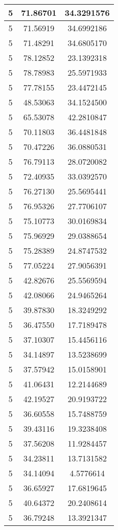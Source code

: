 \documentclass[
]{book}
\begin{document}
\begin{tabular}{c|c|c}
\hline
5 & 71.86701 & 34.3291576\\
\hline
5 & 71.56919 & 34.6992186\\
\hline
5 & 71.48291 & 34.6805170\\
\hline
5 & 78.12852 & 23.1392318\\
\hline
5 & 78.78983 & 25.5971933\\
\hline
5 & 77.78155 & 23.4472145\\
\hline
5 & 48.53063 & 34.1524500\\
\hline
5 & 65.53078 & 42.2810847\\
\hline
5 & 70.11803 & 36.4481848\\
\hline
5 & 70.47226 & 36.0880531\\
\hline
5 & 76.79113 & 28.0720082\\
\hline
5 & 72.40935 & 33.0392570\\
\hline
5 & 76.27130 & 25.5695441\\
\hline
5 & 76.95326 & 27.7706107\\
\hline
5 & 75.10773 & 30.0169834\\
\hline
5 & 75.96929 & 29.0388654\\
\hline
5 & 75.28389 & 24.8747532\\
\hline
5 & 77.05224 & 27.9056391\\
\hline
5 & 42.82676 & 25.5569594\\
\hline
5 & 42.08066 & 24.9465264\\
\hline
5 & 39.87830 & 18.3249292\\
\hline
5 & 36.47550 & 17.7189478\\
\hline
5 & 37.10307 & 15.4456116\\
\hline
5 & 34.14897 & 13.5238699\\
\hline
5 & 37.57942 & 15.0158901\\
\hline
5 & 41.06431 & 12.2144689\\
\hline
5 & 42.19527 & 20.9193722\\
\hline
5 & 36.60558 & 15.7488759\\
\hline
5 & 39.43116 & 19.3238408\\
\hline
5 & 37.56208 & 11.9284457\\
\hline
5 & 34.23811 & 13.7131582\\
\hline
5 & 34.14094 & 4.5776614\\
\hline
5 & 36.65927 & 17.6819645\\
\hline
5 & 40.64372 & 20.2408614\\
\hline
5 & 36.79248 & 13.3921347\\

\end{tabular}
\end{document}
